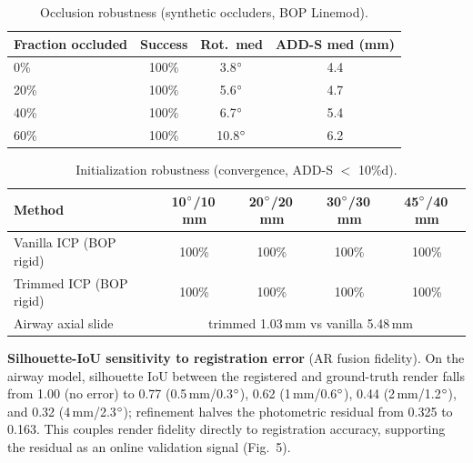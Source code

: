 \documentclass[10pt]{article}
\begin{document}
\begin{table}[h]
\centering
\caption{Occlusion robustness (synthetic occluders, BOP Linemod).}
\label{tab:sup_occ}
\begin{tabular}{lccc}
\toprule
Fraction occluded & Success & Rot.\ med & ADD-S med (mm) \\
\midrule
0\% & 100\% & 3.8$\degree$ & 4.4 \\
20\% & 100\% & 5.6$\degree$ & 4.7 \\
40\% & 100\% & 6.7$\degree$ & 5.4 \\
60\% & 100\% & 10.8$\degree$ & 6.2 \\
\bottomrule
\end{tabular}
\end{table}

\begin{table}[h]
\centering
\caption{Initialization robustness (convergence, ADD-S $<$ 10\%d).}
\label{tab:sup_init}
\begin{tabular}{lcccc}
\toprule
Method & 10$\degree$/10\,mm & 20$\degree$/20\,mm & 30$\degree$/30\,mm & 45$\degree$/40\,mm \\
\midrule
Vanilla ICP (BOP rigid) & 100\% & 100\% & 100\% & 100\% \\
Trimmed ICP (BOP rigid) & 100\% & 100\% & 100\% & 100\% \\
\midrule
Airway axial slide & \multicolumn{4}{c}{trimmed 1.03\,mm vs vanilla 5.48\,mm} \\
\bottomrule
\end{tabular}
\end{table}

\textbf{Silhouette-IoU sensitivity to registration error} (AR fusion fidelity).
On the airway model, silhouette IoU between the registered and ground-truth
render falls from 1.00 (no error) to 0.77 (0.5\,mm/0.3$\degree$), 0.62
(1\,mm/0.6$\degree$), 0.44 (2\,mm/1.2$\degree$), and 0.32 (4\,mm/2.3$\degree$);
refinement halves the photometric residual from 0.325 to 0.163. This couples
render fidelity directly to registration accuracy, supporting the residual as
an online validation signal (Fig.~5).

\end{document}
